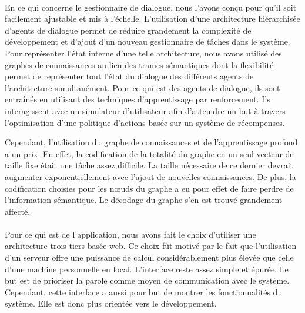 
\paragraph{}
En ce qui concerne le gestionnaire de dialogue, nous l'avons conçu pour qu'il soit facilement ajustable et mis à l'échelle. L'utilisation d'une architecture hiérarchisée d'agents de dialogue permet de réduire grandement la complexité de développement et d'ajout d'un nouveau gestionnaire de tâches dans le système.  Pour représenter l'état interne d'une telle architecture, nous avons utilisé des graphes de connaissances au lieu des trames sémantiques dont la flexibilité permet de représenter tout l'état du dialogue des différents agents de l'architecture simultanément. Pour ce qui est des agents de dialogue, ils sont entraînés en utilisant des techniques d'apprentissage par renforcement. Ils interagissent avec un simulateur d'utilisateur afin d'atteindre un but à travers l'optimisation d'une politique d'actions basée sur un système de récompenses.

Cependant, l'utilisation du graphe de connaissances et de l'apprentissage profond a un prix. En effet, la codification de la totalité du graphe en un seul vecteur de taille fixe était une tâche assez difficile. La taille nécessaire de ce dernier devrait augmenter exponentiellement avec l'ajout de nouvelles connaissances. De plus, la codification choisies pour les n\oe{}uds du graphe a eu pour effet de faire perdre de l'information sémantique. Le décodage du graphe s'en est trouvé grandement affecté.





\paragraph{}
Pour ce qui est de l'application, nous avons fait le choix d'utiliser une architecture trois tiers basée web. Ce choix fût motivé par le fait que l'utilisation d'un serveur offre une puissance de calcul considérablement plus élevée que celle d'une machine personnelle en local. L'interface reste assez simple et épurée. Le but est de prioriser la parole comme moyen de communication avec le système. Cependant, cette interface a aussi pour but de montrer les fonctionnalités du système. Elle est donc plus orientée vers le développement.



